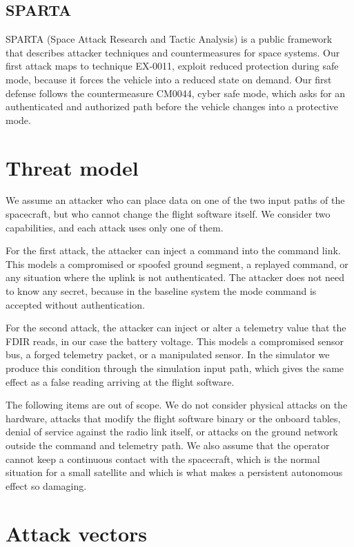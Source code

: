 \documentclass[conference,letterpaper,10pt]{IEEEtran}
\begin{document}
\subsection{SPARTA}
SPARTA (Space Attack Research and Tactic Analysis) is a public framework~\cite{sparta} that describes attacker techniques and countermeasures for space systems. Our first attack maps to technique EX-0011, exploit reduced protection during safe mode, because it forces the vehicle into a reduced state on demand. Our first defense follows the countermeasure CM0044, cyber safe mode, which asks for an authenticated and authorized path before the vehicle changes into a protective mode.

\section{Threat model}
We assume an attacker who can place data on one of the two input paths of the spacecraft, but who cannot change the flight software itself. We consider two capabilities, and each attack uses only one of them.

For the first attack, the attacker can inject a command into the command link. This models a compromised or spoofed ground segment, a replayed command, or any situation where the uplink is not authenticated. The attacker does not need to know any secret, because in the baseline system the mode command is accepted without authentication.

For the second attack, the attacker can inject or alter a telemetry value that the FDIR reads, in our case the battery voltage. This models a compromised sensor bus, a forged telemetry packet, or a manipulated sensor. In the simulator we produce this condition through the simulation input path, which gives the same effect as a false reading arriving at the flight software.

The following items are out of scope. We do not consider physical attacks on the hardware, attacks that modify the flight software binary or the onboard tables, denial of service against the radio link itself, or attacks on the ground network outside the command and telemetry path. We also assume that the operator cannot keep a continuous contact with the spacecraft, which is the normal situation for a small satellite and which is what makes a persistent autonomous effect so damaging.

\section{Attack vectors}
\end{document}
